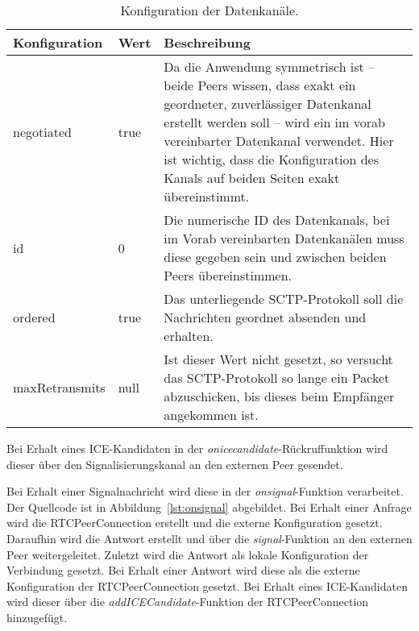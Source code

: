 \begin{table}[ht]
\centering
\begin{tabularx}{\textwidth}{llX}
\toprule
Konfiguration&Wert&Beschreibung\\

\midrule
negotiated&true&Da die Anwendung symmetrisch ist -- beide Peers wissen, dass exakt ein geordneter, zuverlässiger Datenkanal erstellt werden soll -- wird ein im vorab vereinbarter Datenkanal verwendet. Hier ist wichtig, dass die Konfiguration des Kanals auf beiden Seiten exakt übereinstimmt.\\
id&0&Die numerische ID des Datenkanals, bei im Vorab vereinbarten Datenkanälen muss diese gegeben sein und zwischen beiden Peers übereinstimmen.\\
ordered&true&Das unterliegende \acs{SCTP}-Protokoll soll die Nachrichten geordnet absenden und erhalten.\\
maxRetransmits&null&Ist dieser Wert nicht gesetzt, so versucht das  \acs{SCTP}-Protokoll so lange ein Packet abzuschicken, bis dieses beim Empfänger angekommen ist.\\
\bottomrule

\end{tabularx}
\caption{Konfiguration der Datenkanäle.}
\label{table:dataChannelConfig}
\end{table}

Bei Erhalt eines \acs{ICE}-Kandidaten in der \textit{onicecandidate}-Rückruffunktion wird dieser über den Signalisierungskanal an den externen Peer gesendet.\par

Bei Erhalt einer Signalnachricht wird diese in der \textit{onsignal}-Funktion verarbeitet. Der Quellcode ist in Abbildung~\ref{lst:onsignal} abgebildet. Bei Erhalt einer Anfrage wird die RTCPeerConnection erstellt und die externe Konfiguration gesetzt. Daraufhin wird die Antwort erstellt und über die \textit{signal}-Funktion an den externen Peer weitergeleitet. Zuletzt wird die Antwort als lokale Konfiguration der Verbindung gesetzt. Bei Erhalt einer Antwort wird diese als die externe Konfiguration der RTCPeerConnection gesetzt. Bei Erhalt eines \acs{ICE}-Kandidaten wird dieser über die \textit{addICECandidate}-Funktion der RTCPeerConnection hinzugefügt.

